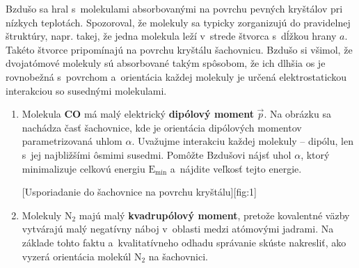 Bzdušo sa hral s~molekulami absorbovanými na povrchu pevných kryštálov pri nízkych teplotách.
Spozoroval, že molekuly sa typicky zorganizujú do pravidelnej štruktúry, napr. takej,
že jedna molekula leží v~strede štvorca s~dĺžkou hrany $a$.
Takéto štvorce pripomínajú na povrchu kryštálu šachovnicu.
Bzdušo si všimol, že dvojatómové molekuly sú absorbované takým spôsobom,
že ich dlhšia os je rovnobežná s~povrchom a~orientácia každej molekuly je
určená elektrostatickou interakciou so susednými molekulami.

\begin{enumerate}[label=\alph*)]
	\item Molekula \textbf{CO} má malý elektrický \textbf{dipólový moment} $\vec{p}$.
		Na obrázku sa nachádza časť šachovnice, kde je orientácia dipólových momentov parametrizovaná uhlom $\alpha$.
		Uvažujme interakciu každej molekuly -- dipólu, len s~jej najbližšími ôsmimi susedmi.
		Pomôžte Bzdušovi nájsť uhol $\alpha$, ktorý minimalizuje celkovú energiu $\mathrm{E}_\text{min}$
		a~nájdite veľkosť tejto energie.
		
		[Usporiadanie do šachovnice na povrchu kryštálu][fig:1]

	\item Molekuly $\text{N}_2$ majú malý \textbf{kvadrupólový moment}, pretože kovalentné väzby vytvárajú
		malý negatívny náboj v~oblasti medzi atómovými jadrami. Na základe tohto faktu a~kvalitatívneho odhadu
		správanie skúste nakresliť, ako vyzerá orientácia molekúl $\text{N}_2$ na šachovnici.
\end{enumerate}
